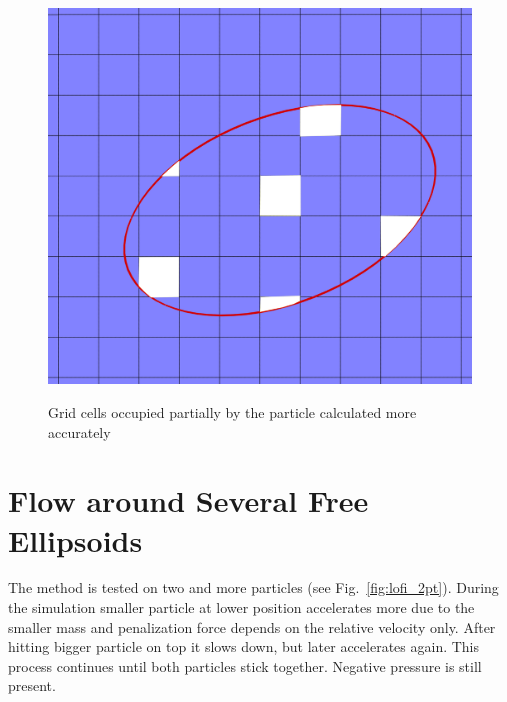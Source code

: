 \begin{figure}[h!]
\centering \includegraphics[scale=0.2]{fig/lofi_vf.png}\\
\caption{Grid cells occupied partially by the particle calculated more accurately \label{fig:lofi-vf}}
\end{figure}

\section{Flow around Several Free Ellipsoids}
The method is tested on two and more particles (see Fig.~\ref{fig:lofi_2pt}). During the simulation smaller particle at lower position accelerates more due to the smaller mass and penalization force depends on the relative velocity only. After hitting bigger particle on top it slows down, but later accelerates again. This process continues until both particles stick together. Negative pressure is still present.


